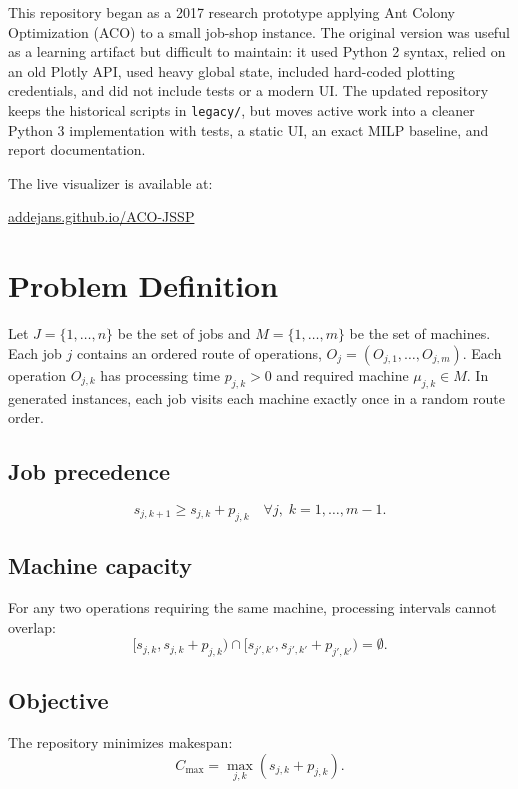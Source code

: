 \documentclass[11pt]{article}
\newcommand{\demo}{\href{https://addejans.github.io/ACO-JSSP/}{addejans.github.io/ACO-JSSP}}
\begin{document}
This repository began as a 2017 research prototype applying Ant Colony Optimization (ACO) to a small job-shop instance. The original version was useful as a learning artifact but difficult to maintain: it used Python 2 syntax, relied on an old Plotly API, used heavy global state, included hard-coded plotting credentials, and did not include tests or a modern UI. The updated repository keeps the historical scripts in \texttt{legacy/}, but moves active work into a cleaner Python 3 implementation with tests, a static UI, an exact MILP baseline, and report documentation.

The live visualizer is available at: \begin{center}\demo\end{center}
\section{Problem Definition}
Let $J = \{1,\ldots,n\}$ be the set of jobs and $M = \{1,\ldots,m\}$ be the set of machines. Each job $j$ contains an ordered route of operations, $O_j=(O_{j,1},\ldots,O_{j,m})$. Each operation $O_{j,k}$ has processing time $p_{j,k}>0$ and required machine $\mu_{j,k}\in M$. In generated instances, each job visits each machine exactly once in a random route order.
\subsection{Job precedence} \[s_{j,k+1}\geq s_{j,k}+p_{j,k}\quad \forall j,\;k=1,\ldots,m-1.\]
\subsection{Machine capacity} For any two operations requiring the same machine, processing intervals cannot overlap: \[[s_{j,k},s_{j,k}+p_{j,k})\cap[s_{j',k'},s_{j',k'}+p_{j',k'})=\emptyset.\]
\subsection{Objective} The repository minimizes makespan: \[C_{\max}=\max_{j,k}(s_{j,k}+p_{j,k}).\]
\end{document}
